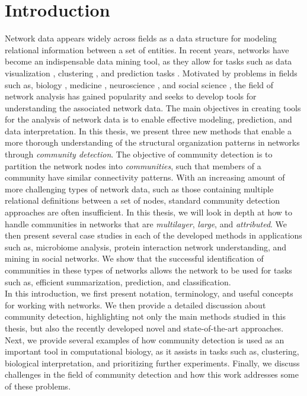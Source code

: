 





% 

\chapter{Introduction}
Network data appears widely across fields as a data structure for modeling relational information between a set of entities.  In recent years, networks have become an indispensable data mining tool, as they allow for tasks such as data visualization \cite{traud}, clustering \cite{fortu2}, and prediction tasks \cite{linkPredReview,collabComm}.  Motivated by problems in fields such as, biology \cite{larremoreparasite}, medicine \cite{immuneClock}, neuroscience \cite{Neuro}, and social science \cite{socialnetwork}, the field of network analysis has gained popularity and seeks to develop tools for understanding the associated network data. The main objectives in creating tools for the analysis of network data is to enable effective modeling, prediction, and data interpretation. In this thesis, we present three new methods that enable a more thorough understanding of the structural organization patterns in networks through \emph{community detection}. The objective of community detection is to partition the network nodes into \emph{communities}, such that members of a community have similar connectivity patterns. With an increasing amount of more challenging types of network data, such as those containing multiple relational definitions between a set of nodes, standard community detection approaches are often insufficient. In this thesis, we will look in depth at how to handle communities in networks that are \emph{multilayer}, \emph{large}, and \emph{attributed}. We then present several case studies in each of the developed methods in applications such as, microbiome analysis, protein interaction network understanding, and mining in social networks. We show that the successful identification of communities in these types of networks allows the network to be used for tasks such as, efficient summarization, prediction, and classification. \\
\indent In this introduction, we first present notation, terminology, and useful concepts for working with networks. We then provide a detailed discussion about community detection, highlighting not only the main methods studied in this thesis, but also the recently developed novel and state-of-the-art approaches. Next, we provide several examples of how community detection is used as an important tool in computational biology, as it assists in tasks such as, clustering, biological interpretation, and prioritizing further experiments. Finally, we discuss challenges in the field of community detection and how this work addresses some of these problems. 

